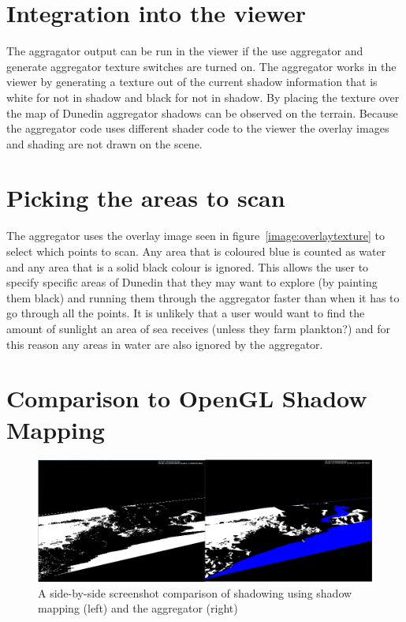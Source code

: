 \documentclass[12pt]{report}
\begin{document}
\section{Integration into the viewer}
The aggragator output can be run in the viewer if the use aggregator and generate aggregator texture switches are turned on. The aggregator works in the viewer by generating a texture out of the current shadow information that is white for not in shadow and black for not in shadow. By placing the texture over the map of Dunedin aggregator shadows can be observed on the terrain. Because the aggregator code uses different shader code to the viewer the overlay images and shading are not drawn on the scene.\\

\section{Picking the areas to scan}
The aggregator uses the overlay image seen in figure~\ref{image:overlaytexture} to select which points to scan. Any area that is coloured blue is counted as water and any area that is a solid black colour is ignored. This allows the user to specify specific areas of Dunedin that they may want to explore (by painting them black) and running them through the aggregator faster than when it has to go through all the points. It is unlikely that a user would want to find the amount of sunlight an area of sea receives (unless they farm plankton?) and for this reason any areas in water are also ignored by the aggregator.\\

\section{Comparison to OpenGL Shadow Mapping}
\begin{figure}[h]
\centering
\includegraphics[scale=0.6]{aggregatorvsshadowmapping.png}
\caption{A side-by-side screenshot comparison of shadowing using shadow mapping (left) and the aggregator (right)}
\label{image:aggregatorvsshadowmapping}
\end{figure}
\end{document}
